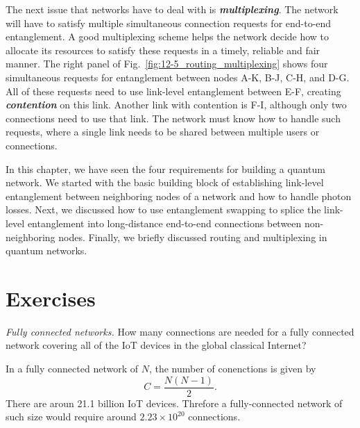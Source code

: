 The next issue that networks have to deal with is \emph{\textbf{multiplexing}}.
The network will have to satisfy multiple simultaneous connection requests for end-to-end entanglement.
A good multiplexing scheme helps the network decide how to allocate its resources to satisfy these requests in a timely, reliable and fair manner.
The right panel of Fig.~\ref{fig:12-5_routing_multiplexing} shows four simultaneous requests for entanglement between nodes A-K, B-J, C-H, and D-G.
All of these requests need to use link-level entanglement between E-F, creating \textbf{\emph{contention}} on this link.
Another link with contention is F-I, although only two connections need to use that link.
The network must know how to handle such requests, where a single link needs to be shared between multiple users or connections.

In this chapter, we have seen the four requirements for building a quantum network.
We started with the basic building block of establishing link-level entanglement between neighboring nodes of a network and how to handle photon losses.
Next, we discussed how to use entanglement swapping to splice the link-level entanglement into long-distance end-to-end connections between non-neighboring nodes.
Finally, we briefly discussed routing and multiplexing in quantum networks.


\newpage
\section{Exercises}

\begin{exercise}
\emph{Fully connected networks.} How many connections are needed for a fully connected network covering all of the IoT devices in the global classical Internet?
\end{exercise}
\begin{solution}
In a fully connected network of $N$, the number of conenctions is given by
\begin{equation*}
    C = \frac{N(N-1)}{2}.
\end{equation*}
There are aroun 21.1 billion IoT devices. Threfore a fully-connected network of such size would require around $2.23\times 10^{20}$ connections.
\end{solution}

